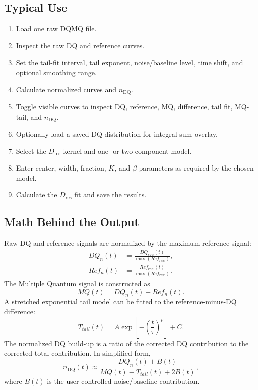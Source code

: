 \documentclass[11pt,a4paper]{article}
\newcommand{\Dres}{\ensuremath{D_{\mathrm{res}}}}
\newcommand{\nDQ}{\ensuremath{n_{\mathrm{DQ}}}}
\begin{document}
\subsection{Typical Use}
\begin{enumerate}
  \item Load one raw DQMQ file.
  \item Inspect the raw DQ and reference curves.
  \item Set the tail-fit interval, tail exponent, noise/baseline level, time shift, and optional smoothing range.
  \item Calculate normalized curves and \nDQ{}.
  \item Toggle visible curves to inspect DQ, reference, MQ, difference, tail fit, MQ-tail, and \nDQ{}.
  \item Optionally load a saved DQ distribution for integral-sum overlay.
  \item Select the \Dres{} kernel and one- or two-component model.
  \item Enter center, width, fraction, \(K\), and \(\beta\) parameters as required by the chosen model.
  \item Calculate the \Dres{} fit and save the results.
\end{enumerate}

\subsection{Math Behind the Output}
Raw DQ and reference signals are normalized by the maximum reference signal:
\begin{align}
DQ_n(t)&=\frac{DQ_{raw}(t)}{\max(Ref_{raw})},\\
Ref_n(t)&=\frac{Ref_{raw}(t)}{\max(Ref_{raw})}.
\end{align}
The Multiple Quantum signal is constructed as
\begin{equation}
MQ(t)=DQ_n(t)+Ref_n(t).
\end{equation}
A stretched exponential tail model can be fitted to the reference-minus-DQ difference:
\begin{equation}
T_{tail}(t)=A\exp\left[-\left(\frac{t}{\tau}\right)^p\right]+C.
\end{equation}
The normalized DQ build-up is a ratio of the corrected DQ contribution to the corrected total contribution. In simplified form,
\begin{equation}
\nDQ(t)\approx\frac{DQ_n(t)+B(t)}{MQ(t)-T_{tail}(t)+2B(t)},
\end{equation}
where \(B(t)\) is the user-controlled noise/baseline contribution.
\end{document}
